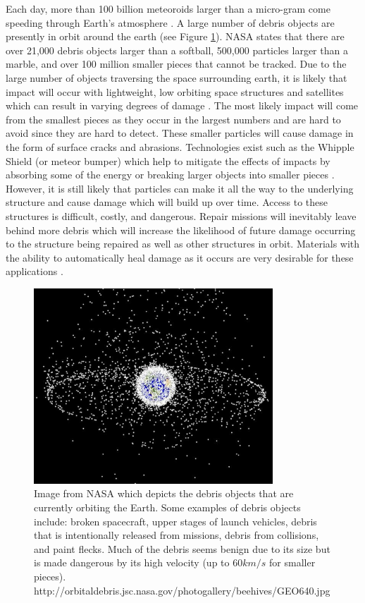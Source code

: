 
Each day, more than 100 billion meteoroids larger than a micro-gram come speeding through Earth's atmosphere \cite{Close2010}. A large number of debris objects are presently in orbit around the earth (see Figure \ref{fig:orbitalDebris}). NASA states that there are over 21,000 debris objects larger than a softball, 500,000 particles larger than a marble, and over 100 million smaller pieces that cannot be tracked. Due to the large number of objects traversing the space surrounding earth, it is likely that impact will occur with lightweight, low orbiting space structures and satellites which can result in varying degrees of damage \cite{NASAOD2012}. The most likely impact will come from the smallest pieces as they occur in the largest numbers and are hard to avoid since they are hard to detect. These smaller particles will cause damage in the form of surface cracks and abrasions. Technologies exist such as the Whipple Shield (or meteor bumper) which help to mitigate the effects of impacts by absorbing some of the energy or breaking larger objects into smaller pieces \cite{NASAHVIT2012}. However, it is still likely that particles can make it all the way to the underlying structure and cause damage which will build up over time. Access to these structures is difficult, costly, and dangerous. Repair missions will inevitably leave behind more debris which will increase the likelihood of future damage occurring to the structure being repaired as well as other structures in orbit. Materials with the ability to automatically heal damage as it occurs are very desirable for these applications \cite{Lee2009}.

\begin{figure}[ht!]
\centering
\includegraphics[width=0.8\textwidth]{eps_pics/orbitalDebris}
\caption{ Image from NASA which depicts the debris objects that are currently orbiting the Earth. Some examples of debris objects include: broken spacecraft, upper stages of launch vehicles, debris that is intentionally released from missions, debris from collisions, and paint flecks. Much of the debris seems benign due to its size but is made dangerous by its high velocity (up to $60 km/s$ for smaller pieces).
\newline
http://orbitaldebris.jsc.nasa.gov/photogallery/beehives/GEO640.jpg
	 \label{fig:orbitalDebris}} 
\end{figure}

